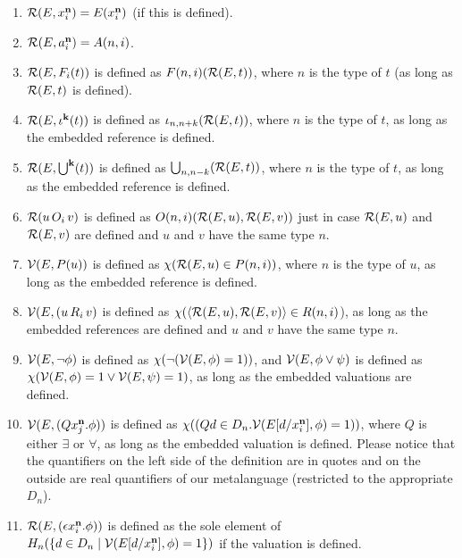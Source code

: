 \documentclass[12pt]{book}
\begin{document}
\begin{enumerate}

\item ${\cal R}(E,x^{\bf n}_i) = E(x^{\bf n}_i)$ (if this is defined).

\item ${\cal R}(E,a^{\bf n}_i) = A(n,i)$.

\item ${\cal R}(E,F_i(t))$ is defined as $F(n,i)({\cal R}(E,t))$, where
$n$ is the type of $t$ (as long as ${\cal R}(E,t)$ is defined).

\item ${\cal R}(E,\iota^{\bf k}(t))$ is defined as $\iota_{n,n+k}({\cal
R}(E,t))$, where $n$ is the type of $t$, as long as the
embedded reference is defined. 

\item ${\cal R}(E,\bigcup^{\bf k}(t))$ is defined as $\bigcup_{n,n-k}({\cal
R}(E,t))$, where $n$ is the type of $t$, as long as the
embedded reference is defined. 

\item ${\cal R}(u \,O_i\, v)$ is defined as $O(n,i)({\cal
R}(E,u),{\cal R}(E,v))$ just in case ${\cal R}(E,u)$ and ${\cal
R}(E,v)$ are defined and $u$ and $v$ have the same type $n$.

\item ${\cal V}(E,P(u))$ is defined as $\chi({\cal R}(E,u) \in P(n,i))$,
where $n$ is the type of $u$, as long as the embedded reference is
defined.

\item ${\cal V}(E,(u \, R_i \, v)$ is defined as $\chi(\left<{\cal
R}(E,u),{\cal R}(E,v)\right> \in R(n,i)$), as long as the embedded
references are defined and $u$ and $v$ have the same type $n$.

\item ${\cal V}(E,\neg\phi)$ is defined as $\chi(\neg({\cal
V}(E,\phi)=1))$, and ${\cal V}(E,\phi\vee\psi)$ is defined as $\chi({\cal
V}(E,\phi)=1 \vee {\cal V}(E,\psi)=1)$, as long as the embedded
valuations are defined.

\item ${\cal V}(E,(Qx^{\bf n}_j.\phi))$ is defined as $\chi((Qd \in D_n.{\cal
V}(E[d/x^{\bf n}_i],\phi)=1))$, where $Q$ is either $\exists$ or
$\forall$, as long as the embedded valuation is defined.   Please notice that the quantifiers on the left side of the definition are in quotes
and on the outside are real quantifiers of our metalanguage (restricted to the appropriate $D_n$).

\item ${\cal R}(E,(\epsilon x^{\bf n}_i.\phi))$ is defined as the sole
element of $H_n(\{d \in D_n\mid {\cal V}(E[d/x^{\bf n}_i],\phi)=1\})$
if the valuation is defined.

\end{enumerate}
\end{document}
